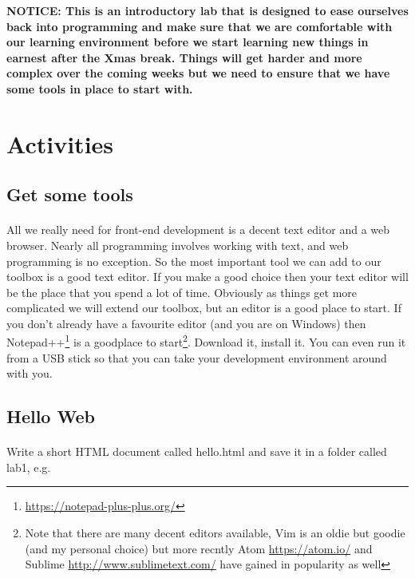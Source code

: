 \documentclass[10pt, a4paper]{article}
\begin{document}
\begin{framed}
{\bf{NOTICE:} This is an introductory lab that is designed to ease ourselves back into programming and make sure that we are comfortable with our learning environment before we start learning new things in earnest after the Xmas break. Things will get harder and more complex over the coming weeks but we need to ensure that we have some tools in place to start with.}  
\end{framed}


\section{Activities}

\subsection{Get some tools}

\paragraph{} All we really need for front-end development is a decent text editor and a web browser. Nearly all programming involves working with text, and web programming is no exception. So the most important tool we can add to our toolbox is a good text editor. If you make a good choice then your text editor will be the place that you spend a lot of time. Obviously as things get more complicated we will extend our toolbox, but an editor is a good place to start. If you don't already have a favourite editor (and you are on Windows) then Notepad++\footnote{\url{https://notepad-plus-plus.org/}} is a goodplace to start\footnote{Note that there are many decent editors available, Vim is an oldie but goodie (and my personal choice) but more recntly Atom \url{https://atom.io/} and Sublime \url{http://www.sublimetext.com/} have gained in popularity as well}. Download it, install it. You can even run it from a USB stick so that you can take your development environment around with you.

\subsection{Hello Web}

\paragraph{} Write a short HTML document called hello.html and save it in a folder called lab1, e.g.
\end{document}
